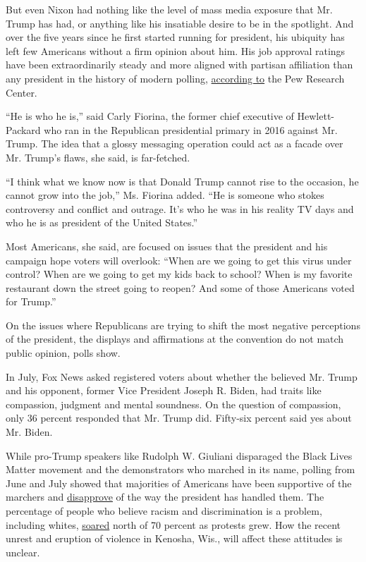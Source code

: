 But even Nixon had nothing like the level of mass media exposure that
Mr. Trump has had, or anything like his insatiable desire to be in the
spotlight. And over the five years since he first started running for
president, his ubiquity has left few Americans without a firm opinion
about him. His job approval ratings have been extraordinarily steady and
more aligned with partisan affiliation than any president in the history
of modern polling,
\href{https://www.pewresearch.org/fact-tank/2020/08/24/trumps-approval-ratings-so-far-are-unusually-stable-and-deeply-partisan/}{according
to} the Pew Research Center.

``He is who he is,'' said Carly Fiorina, the former chief executive of
Hewlett-Packard who ran in the Republican presidential primary in 2016
against Mr. Trump. The idea that a glossy messaging operation could act
as a facade over Mr. Trump's flaws, she said, is far-fetched.

``I think what we know now is that Donald Trump cannot rise to the
occasion, he cannot grow into the job,'' Ms. Fiorina added. ``He is
someone who stokes controversy and conflict and outrage. It's who he was
in his reality TV days and who he is as president of the United
States.''

Most Americans, she said, are focused on issues that the president and
his campaign hope voters will overlook: ``When are we going to get this
virus under control? When are we going to get my kids back to school?
When is my favorite restaurant down the street going to reopen? And some
of those Americans voted for Trump.''

On the issues where Republicans are trying to shift the most negative
perceptions of the president, the displays and affirmations at the
convention do not match public opinion, polls show.

In July, Fox News asked registered voters about whether the believed Mr.
Trump and his opponent, former Vice President Joseph R. Biden, had
traits like compassion, judgment and mental soundness. On the question
of compassion, only 36 percent responded that Mr. Trump did. Fifty-six
percent said yes about Mr. Biden.

While pro-Trump speakers like Rudolph W. Giuliani disparaged the Black
Lives Matter movement and the demonstrators who marched in its name,
polling from June and July showed that majorities of Americans have been
supportive of the marchers and
\href{https://www.reuters.com/article/us-usa-election-poll/support-dips-for-protests-but-many-americans-reject-trumps-response-reuters-ipsos-poll-idUSKCN24U1EX}{disapprove}
of the way the president has handled them. The percentage of people who
believe racism and discrimination is a problem, including whites,
\href{https://www.nytimes3xbfgragh.onion/2020/06/05/us/politics/polling-george-floyd-protests-racism.html}{soared}
north of 70 percent as protests grew. How the recent unrest and eruption
of violence in Kenosha, Wis., will affect these attitudes is unclear.

